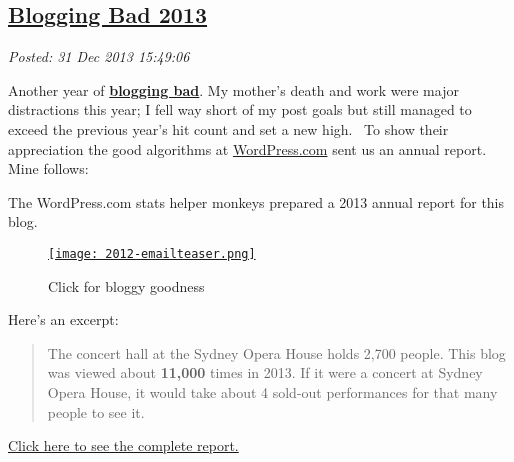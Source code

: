 %

\subsection*{\href{http://bakerjd99.wordpress.com/2013/12/31/blogging-bad-2013/}{Blogging Bad 2013}}


\noindent\emph{Posted: 31 Dec 2013 15:49:06}
\vspace{6pt}

Another year of \href{http://www.buzzfeed.com/regajha/21-things-youre-sick-of-hearing-if-you-dont-watc}{\textbf{blogging bad}}. My mother's death and work were
major distractions this year; I fell way short of my post goals but
still managed to exceed the previous year's hit count and set a new
high. ~To show their appreciation the good algorithms at \href{http://wordpress.com/}{WordPress.com}
sent us an annual report. Mine follows:

\medskip

The WordPress.com stats helper monkeys prepared a 2013 annual report for
this blog.

\captionsetup[floatingfigure]{labelformat=empty}
\begin{figure}[htbp]
\centering
\href{http://bakerjd99.wordpress.com/2013/annual-report/}{\texttt{[image: 2012-emailteaser.png]}}
\caption{Click for bloggy goodness}
\label{fig:4473X0}
\end{figure}

Here's an excerpt:

\begin{quote}
The concert hall at the Sydney Opera House holds 2,700 people. This blog
was viewed about \textbf{11,000} times in 2013. If it were a concert at
Sydney Opera House, it would take about 4 sold-out performances for that
many people to see it.
\end{quote}

\href{http://bakerjd99.wordpress.com/2013/annual-report/}{Click here to
see the complete report.}




%